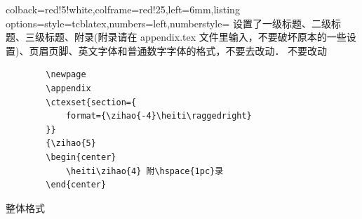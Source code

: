 \documentclass{JXUSTmodeling}
\begin{document}
\begin{example}[htbp]
    \centering
    \begin{tcblisting}{colback=red!5!white,colframe=red!25,left=6mm,listing options={style=tcblatex,numbers=left,numberstyle=\tiny\color{red!75!black}}}
    设置了一级标题、二级标题、三级标题、附录(附录请在 appendix.tex 文件里输入，不要破坏原本的一些设置)、页眉页脚、英文字体和普通数字字体的格式，不要去改动．
    不要改动
    \begin{verbatim}
        \newpage
        \appendix
        \ctexset{section={
            format={\zihao{-4}\heiti\raggedright}
        }}
        {\zihao{5}
        \begin{center}
            \heiti\zihao{4} 附\hspace{1pc}录
        \end{center}
    \end{verbatim}
\end{tcblisting}
    \caption{整体格式}\label{exam:13}
\end{example}

    
    
\end{document}
